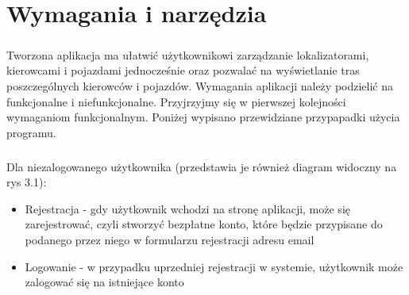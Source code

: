 \chapter{Wymagania i narzędzia}
\label{ch:wymagania-i-narzedzia}

\paragraph{}
Tworzona aplikacja ma ułatwić użytkownikowi zarządzanie lokalizatorami, kierowcami i pojazdami jednocześnie oraz pozwalać na wyświetlanie tras poszczególnych kierowców i pojazdów. Wymagania aplikacji należy podzielić na funkcjonalne i niefunkcjonalne. Przyjrzyjmy się w pierwszej kolejności wymaganiom funkcjonalnym. Poniżej wypisano przewidziane przypapadki użycia programu.

\paragraph{}
Dla niezalogowanego użytkownika (przedstawia je również diagram widoczny na rys 3.1):

\begin{itemize}
\item Rejestracja - gdy użytkownik wchodzi na stronę aplikacji, może się zarejestrować, czyli stworzyć bezpłatne konto, które będzie przypisane do podanego przez niego w formularzu rejestracji adresu email
\item Logowanie - w przypadku uprzedniej rejestracji w systemie, użytkownik może zalogować się na istniejące konto
\end{itemize}

